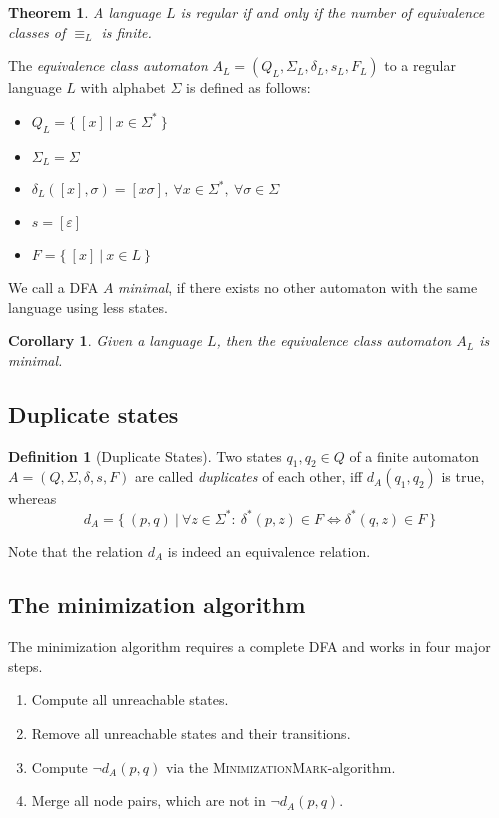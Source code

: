 \documentclass[a4paper, oneside, 11pt]{report}
\newtheorem{theorem}{Theorem}
\newtheorem{corollary}{Corollary}
\theoremstyle{definition}
\newtheorem{definition}{Definition}
\theoremstyle{remark}
\newcommand{\MinMark}{\textsc{MinimizationMark}}
\begin{document}
\begin{theorem}
	A language $L$ is regular if and only if the number of equivalence classes of $\equiv_L$ is finite.
\end{theorem}

The \emph{equivalence class automaton} $A_L = (Q_L, \Sigma_L, \delta_L, s_L, F_L)$ to a regular language $L$ with alphabet $\Sigma$ is defined as follows:
\begin{itemize}
	\item $Q_L = \{\ [x]\ |\ x \in \Sigma^*\ \}$
	\item $\Sigma_L = \Sigma$
	\item $\delta_L([x], \sigma) = [x\sigma],\ \forall x\in\Sigma^*,\ \forall\sigma\in\Sigma$
	\item $s = [\varepsilon]$
	\item $F = \{\ [x]\ |\ x \in L\ \}$
\end{itemize}
We call a DFA $A$ \emph{minimal}, if there exists no other automaton with the same language using less states.
\begin{corollary}
	Given a language $L$, then the equivalence class automaton $A_L$ is minimal.
\end{corollary}

\subsection{Duplicate states}

\begin{definition}[Duplicate States]
	Two states $q_1, q_2 \in Q$ of a finite automaton $A = (Q, \Sigma, \delta, s, F)$ are called \emph{duplicates} of each other, iff $d_A(q_1, q_2)$ is true, whereas
	\[
		d_A = \{\ (p, q)\ |\ \forall z \in \Sigma^* \colon\ \delta^*(p, z) \in F \Leftrightarrow \delta^*(q, z) \in F\ \}
	\]
\end{definition}
Note that the relation $d_A$ is indeed an equivalence relation.

\subsection{The minimization algorithm}

The minimization algorithm requires a complete DFA and works in four major steps.
\begin{enumerate}
	\item Compute all unreachable states.
	\item Remove all unreachable states and their transitions.
	\item Compute $\neg d_A(p, q)$ via the \MinMark-algorithm.
	\item Merge all node pairs, which are not in $\neg d_A(p, q)$.
\end{enumerate}
\end{document}
